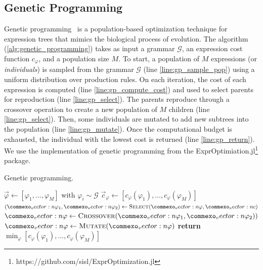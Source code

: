 \subsection{Genetic Programming}
\label{subsec:gp}
Genetic programming~\cite{kochenderfer2019algorithms, koza1992genetic} is a population-based optimization technique for expression trees that mimics the biological process of evolution. The algorithm (\cref{alg:genetic_programming}) takes as input a grammar $\mathcal{G}$, an expression cost function $c_\varphi$, and a population size $M$. To start, a population of $M$ expressions (or \emph{individuals}) is sampled from the grammar $\mathcal{G}$ (line \ref{line:gp_sample_pop}) using a uniform distribution over production rules. On each iteration, the cost of each expression is computed (line \ref{line:gp_compute_cost}) and used to select parents for reproduction (line \ref{line:gp_select}). The parents reproduce through a crossover operation to create a new population of $M$ children (line \ref{line:gp_select}). Then, some individuals are mutated to add new subtrees into the population (line \ref{line:gp_mutate}). Once the computational budget is exhausted, the individual with the lowest cost is returned (line \ref{line:gp_return}). We use the implementation of genetic programming from the ExprOptimiation.jl\footnote{https://github.com/sisl/ExprOptimization.jl} package.

\begin{algorithm}
\caption{Genetic programming.} \label{alg:genetic_programming}
\begin{algorithmic}[1]
    \State  $\vec{\varphi} \gets [\varphi_1, \ldots, \varphi_M]$ with  $\varphi_i \sim \mathcal{G}$ \label{line:gp_sample_pop}
    \Loop
        \State $\vec{c}_\varphi \gets [c_\varphi(\varphi_1), \ldots, c_\varphi(\varphi_M)]$ \label{line:gp_compute_cost}
        \State $(\vec{\varphi}_1, \vec{\varphi}_2) \gets \textproc{Select}(\vec{\varphi}, \vec{c})$ \label{line:gp_select}
        \State $\vec{\varphi} \gets \textproc{Crossover}(\vec{\varphi}_1, \vec{\varphi}_2))$ \label{line:gp_crossover}
        \State $\vec{\varphi} \gets \textproc{Mutate}(\vec{\varphi})$ \label{line:gp_mutate}
    \EndLoop
    \State \textbf{return} $\min_\varphi [c_\varphi(\varphi_1), \ldots, c_\varphi(\varphi_M)]$ \label{line:gp_return}
    \EndFunction
\end{algorithmic}
\end{algorithm}



